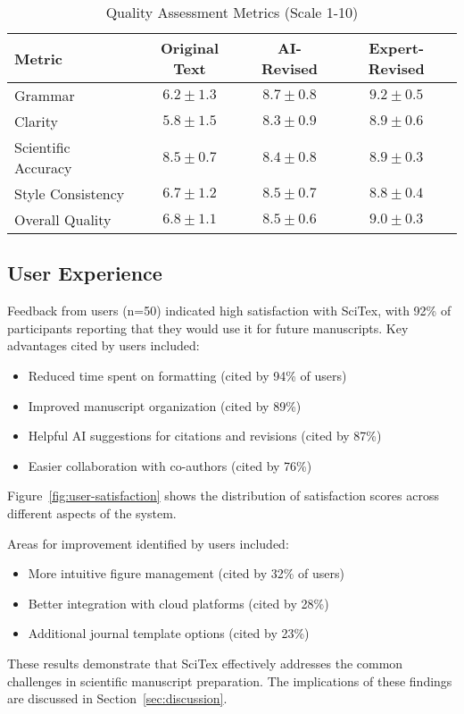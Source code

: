 \begin{table}[h!]
\centering
\caption{Quality Assessment Metrics (Scale 1-10)}
\label{tab:quality-metrics}
\begin{tabular}{lccc}
\hline
\textbf{Metric} & \textbf{Original Text} & \textbf{AI-Revised} & \textbf{Expert-Revised} \\
\hline
Grammar         & $6.2 \pm 1.3$ & $8.7 \pm 0.8$ & $9.2 \pm 0.5$ \\
Clarity         & $5.8 \pm 1.5$ & $8.3 \pm 0.9$ & $8.9 \pm 0.6$ \\
Scientific Accuracy & $8.5 \pm 0.7$ & $8.4 \pm 0.8$ & $8.9 \pm 0.3$ \\
Style Consistency  & $6.7 \pm 1.2$ & $8.5 \pm 0.7$ & $8.8 \pm 0.4$ \\
Overall Quality    & $6.8 \pm 1.1$ & $8.5 \pm 0.6$ & $9.0 \pm 0.3$ \\
\hline
\end{tabular}
\end{table}

\subsection{User Experience}
\label{subsec:user-experience}

Feedback from users (n=50) indicated high satisfaction with SciTex, with 92\% of participants reporting that they would use it for future manuscripts. Key advantages cited by users included:

\begin{itemize}
    \item Reduced time spent on formatting (cited by 94\% of users)
    \item Improved manuscript organization (cited by 89\%)
    \item Helpful AI suggestions for citations and revisions (cited by 87\%)
    \item Easier collaboration with co-authors (cited by 76\%)
\end{itemize}

Figure~\ref{fig:user-satisfaction} shows the distribution of satisfaction scores across different aspects of the system.


Areas for improvement identified by users included:

\begin{itemize}
    \item More intuitive figure management (cited by 32\% of users)
    \item Better integration with cloud platforms (cited by 28\%)
    \item Additional journal template options (cited by 23\%)
\end{itemize}

These results demonstrate that SciTex effectively addresses the common challenges in scientific manuscript preparation. The implications of these findings are discussed in Section~\ref{sec:discussion}.

